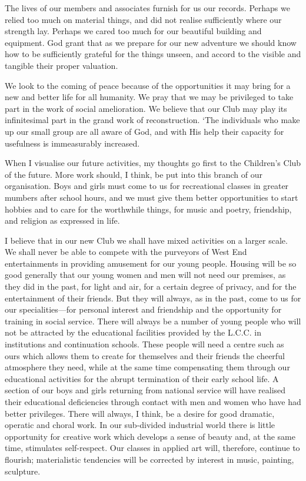 The lives of our members and associates furnish for us
our records. Perhaps we relied too much on material
things, and did not realise sufficiently where our strength
lay. Perhaps we cared too much for our beautiful building
and equipment. God grant that as we prepare for
our new adventure we should know how to be sufficiently
grateful for the things unseen, and accord to the visible
and tangible their proper valuation.

We look to the coming of peace because of the opportunities
it may bring for a new and better life for all
humanity. We pray that we may be privileged to take
part in the work of social amelioration. We believe that
our Club may play its infinitesimal part in the grand
work of reconstruction. ‘The individuals who make up
our small group are all aware of God, and with His
help their capacity for usefulness is immeasurably
increased.

When I visualise our future activities, my thoughts
go first to the Children’s Club of the future. More work
should, I think, be put into this branch of our organisation.
Boys and girls must come to us for recreational
classes in greater mumbers after school hours, and we
must give them better opportunities to start hobbies and
to care for the worthwhile things, for music and poetry,
friendship, and religion as expressed in life.

I believe that in our new Club we shall have mixed
activities on a larger scale. We shall never be able to
compete with the purveyors of West End entertainments
in providing amusement for our young people. Housing
will be so good generally that our young women and men
will not need our premises, as they did in the past, for
light and air, for a certain degree of privacy, and for the
entertainment of their friends. But they will always, as in
the past, come to us for our specialities—for personal
interest and friendship and the opportunity for training in
social service. There will always be a number of young
people who will not be attracted by the educational facilities
provided by the L.C.C. in institutions and continuation
schools. These people will need a centre such as ours
which allows them to create for themselves and their
friends the cheerful atmosphere they need, while at the
same time compensating them through our educational
activities for the abrupt termination of their early school
life. A section of our boys and girls returning from
national service will have realised their educational
deficiencies through contact with men and women who
have had better privileges. There will always, I think,
be a desire for good dramatic, operatic and choral work.
In our sub-divided industrial world there is little opportunity
for creative work which develops a sense of beauty
and, at the same time, stimulates self-respect. Our classes
in applied art will, therefore, continue to flourish;
materialistic tendencies will be corrected by interest in
music, painting, sculpture.

